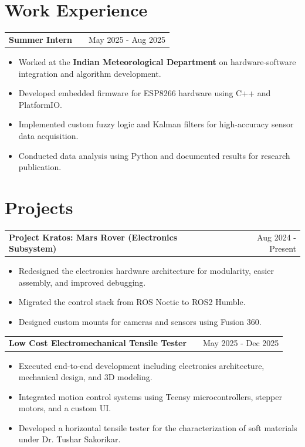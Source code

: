 \documentclass[a4paper,12pt]{article}
\makeatletter
\newenvironment{joblong}[2]
    {\begin{tabularx}{\linewidth}{@{}l X r@{}} \textbf{#1} & \hfill &  #2 \\[3.75pt] \end{tabularx}
    \begin{minipage}[t]{\linewidth}
    \begin{itemize}[nosep,after=\strut, leftmargin=1em, itemsep=3pt,label=--]}
    {\end{itemize} \end{minipage}}
\makeatother
\begin{document}
\section{Work Experience}
\begin{joblong}{Summer Intern \href{https://github.com/KevinBMathew/SensorFusion_ESP8266}{\raisebox{-0.05\height}\faGithub}}{May 2025 - Aug 2025}
\item Worked at the \textbf{Indian Meteorological Department} on hardware-software integration and algorithm development.
\item Developed embedded firmware for ESP8266 hardware using C++ and PlatformIO.
\item Implemented custom fuzzy logic and Kalman filters for high-accuracy sensor data acquisition.
\item Conducted data analysis using Python and documented results for research publication.
\end{joblong}

\section{Projects}

\begin{joblong}{Project Kratos: Mars Rover (Electronics Subsystem) \href{https://github.com/KevinBMathew/irc2025}{\raisebox{-0.05\height}\faGithub}}{Aug 2024 - Present}
\item Redesigned the electronics hardware architecture for modularity, easier assembly, and improved debugging.
\item Migrated the control stack from ROS Noetic to ROS2 Humble.
\item Designed custom mounts for cameras and sensors using Fusion 360.
\end{joblong}

\begin{joblong}{Low Cost Electromechanical Tensile Tester}{May 2025 - Dec 2025}
\item Executed end-to-end development including electronics architecture, mechanical design, and 3D modeling.
\item Integrated motion control systems using Teensy microcontrollers, stepper motors, and a custom UI.
\item Developed a horizontal tensile tester for the characterization of soft materials under Dr. Tushar Sakorikar.
\end{joblong}
\end{document}
